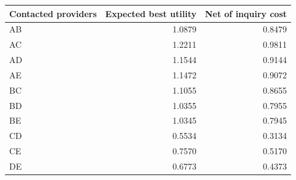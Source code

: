 \begin{tabular}{lrr}
\toprule
Contacted providers & Expected best utility & Net of inquiry cost \\
\midrule
AB & 1.0879 & 0.8479 \\
AC & 1.2211 & 0.9811 \\
AD & 1.1544 & 0.9144 \\
AE & 1.1472 & 0.9072 \\
BC & 1.1055 & 0.8655 \\
BD & 1.0355 & 0.7955 \\
BE & 1.0345 & 0.7945 \\
CD & 0.5534 & 0.3134 \\
CE & 0.7570 & 0.5170 \\
DE & 0.6773 & 0.4373 \\
\bottomrule
\end{tabular}
